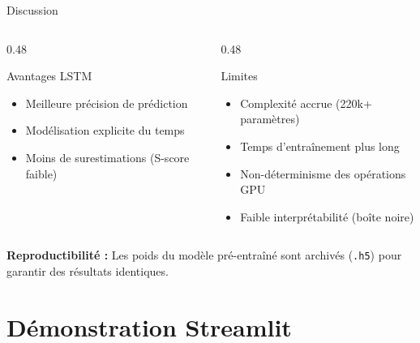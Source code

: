 \documentclass[aspectratio=169,11pt]{beamer}
\begin{document}
\begin{frame}{Discussion}
\begin{columns}[T]
\begin{column}{0.48\textwidth}
\begin{block}{Avantages LSTM}
\begin{itemize}
    \item Meilleure précision de prédiction
    \item Modélisation explicite du temps
    \item Moins de surestimations (S-score faible)
\end{itemize}
\end{block}
\end{column}
\begin{column}{0.48\textwidth}
\begin{alertblock}{Limites}
\begin{itemize}
    \item Complexité accrue (220k+ paramètres)
    \item Temps d'entraînement plus long
    \item Non-déterminisme des opérations GPU
    \item Faible interprétabilité (boîte noire)
\end{itemize}
\end{alertblock}
\end{column}
\end{columns}
\vspace{0.4cm}
\textbf{Reproductibilité :} Les poids du modèle pré-entraîné sont archivés (\texttt{.h5}) pour garantir des résultats identiques.
\end{frame}

\section{Démonstration Streamlit}
\end{document}
